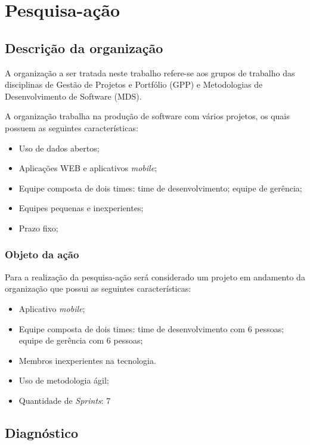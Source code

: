 \chapter{Pesquisa-ação}

	\section{Descrição da organização}

		A organização a ser tratada neste trabalho refere-se aos grupos de trabalho das disciplinas de Gestão de Projetos 
		e Portfólio (GPP) e Metodologias de Desenvolvimento de Software (MDS).

		A organização trabalha na produção de software com vários projetos, os quais possuem as seguintes características:

		\begin{itemize}
			\item Uso de dados abertos;
			\item Aplicações WEB e aplicativos \textit{mobile};
			\item Equipe composta de dois times:
				 time de desenvolvimento;
				 equipe de gerência;
			\item Equipes pequenas e inexperientes;
			\item Prazo fixo;
		\end{itemize}

		\subsection{Objeto da ação}

		Para a realização da pesquisa-ação será considerado um projeto em andamento da organização que possui as seguintes características:


		\begin{itemize}
			\item Aplicativo \textit{mobile};
			\item Equipe composta de dois times:
				 time de desenvolvimento com 6 pessoas;
				 equipe de gerência com 6 pessoas;
			\item Membros inexperientes na tecnologia.
			\item Uso de metodologia ágil;
			\item Quantidade de \textit{Sprints}: 7
		\end{itemize}



\section{Diagnóstico}
	



